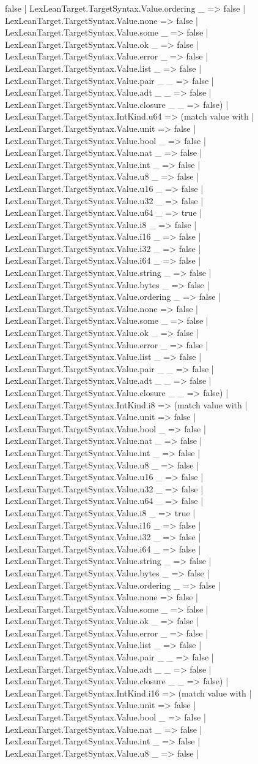 \documentclass[11pt]{article}
\begin{document}
false | LexLeanTarget.TargetSyntax.Value.ordering \_ => false | LexLeanTarget.TargetSyntax.Value.none => false | LexLeanTarget.TargetSyntax.Value.some \_ => false | LexLeanTarget.TargetSyntax.Value.ok \_ => false | LexLeanTarget.TargetSyntax.Value.error \_ => false | LexLeanTarget.TargetSyntax.Value.list \_ => false | LexLeanTarget.TargetSyntax.Value.pair \_ \_ => false | LexLeanTarget.TargetSyntax.Value.adt \_ \_ => false | LexLeanTarget.TargetSyntax.Value.closure \_ \_ => false) | LexLeanTarget.TargetSyntax.IntKind.u64 => (match value with | LexLeanTarget.TargetSyntax.Value.unit => false | LexLeanTarget.TargetSyntax.Value.bool \_ => false | LexLeanTarget.TargetSyntax.Value.nat \_ => false | LexLeanTarget.TargetSyntax.Value.int \_ => false | LexLeanTarget.TargetSyntax.Value.u8 \_ => false | LexLeanTarget.TargetSyntax.Value.u16 \_ => false | LexLeanTarget.TargetSyntax.Value.u32 \_ => false | LexLeanTarget.TargetSyntax.Value.u64 \_ => true | LexLeanTarget.TargetSyntax.Value.i8 \_ => false | LexLeanTarget.TargetSyntax.Value.i16 \_ => false | LexLeanTarget.TargetSyntax.Value.i32 \_ => false | LexLeanTarget.TargetSyntax.Value.i64 \_ => false | LexLeanTarget.TargetSyntax.Value.string \_ => false | LexLeanTarget.TargetSyntax.Value.bytes \_ => false | LexLeanTarget.TargetSyntax.Value.ordering \_ => false | LexLeanTarget.TargetSyntax.Value.none => false | LexLeanTarget.TargetSyntax.Value.some \_ => false | LexLeanTarget.TargetSyntax.Value.ok \_ => false | LexLeanTarget.TargetSyntax.Value.error \_ => false | LexLeanTarget.TargetSyntax.Value.list \_ => false | LexLeanTarget.TargetSyntax.Value.pair \_ \_ => false | LexLeanTarget.TargetSyntax.Value.adt \_ \_ => false | LexLeanTarget.TargetSyntax.Value.closure \_ \_ => false) | LexLeanTarget.TargetSyntax.IntKind.i8 => (match value with | LexLeanTarget.TargetSyntax.Value.unit => false | LexLeanTarget.TargetSyntax.Value.bool \_ => false | LexLeanTarget.TargetSyntax.Value.nat \_ => false | LexLeanTarget.TargetSyntax.Value.int \_ => false | LexLeanTarget.TargetSyntax.Value.u8 \_ => false | LexLeanTarget.TargetSyntax.Value.u16 \_ => false | LexLeanTarget.TargetSyntax.Value.u32 \_ => false | LexLeanTarget.TargetSyntax.Value.u64 \_ => false | LexLeanTarget.TargetSyntax.Value.i8 \_ => true | LexLeanTarget.TargetSyntax.Value.i16 \_ => false | LexLeanTarget.TargetSyntax.Value.i32 \_ => false | LexLeanTarget.TargetSyntax.Value.i64 \_ => false | LexLeanTarget.TargetSyntax.Value.string \_ => false | LexLeanTarget.TargetSyntax.Value.bytes \_ => false | LexLeanTarget.TargetSyntax.Value.ordering \_ => false | LexLeanTarget.TargetSyntax.Value.none => false | LexLeanTarget.TargetSyntax.Value.some \_ => false | LexLeanTarget.TargetSyntax.Value.ok \_ => false | LexLeanTarget.TargetSyntax.Value.error \_ => false | LexLeanTarget.TargetSyntax.Value.list \_ => false | LexLeanTarget.TargetSyntax.Value.pair \_ \_ => false | LexLeanTarget.TargetSyntax.Value.adt \_ \_ => false | LexLeanTarget.TargetSyntax.Value.closure \_ \_ => false) | LexLeanTarget.TargetSyntax.IntKind.i16 => (match value with | LexLeanTarget.TargetSyntax.Value.unit => false | LexLeanTarget.TargetSyntax.Value.bool \_ => false | LexLeanTarget.TargetSyntax.Value.nat \_ => false | LexLeanTarget.TargetSyntax.Value.int \_ => false | LexLeanTarget.TargetSyntax.Value.u8 \_ => false | 
\end{document}
